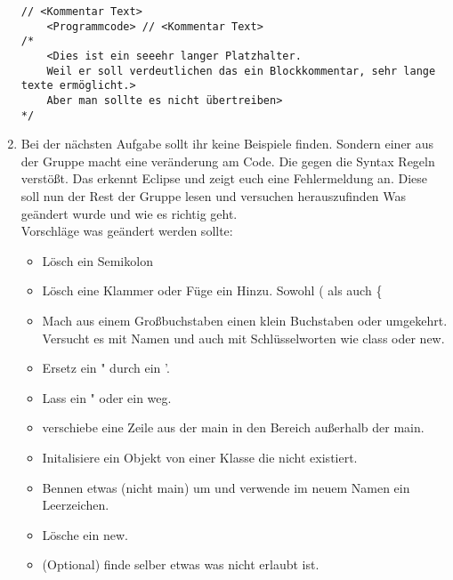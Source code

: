 \begin{enumerate}
          \begin{lstlisting}[title=\textbf{Kommentar Syntax},firstnumber=11]
// <Kommentar Text>
    <Programmcode> // <Kommentar Text>
/*
    <Dies ist ein seeehr langer Platzhalter. 
    Weil er soll verdeutlichen das ein Blockkommentar, sehr lange texte ermöglicht.>
    Aber man sollte es nicht übertreiben>
*/
        \end{lstlisting}
    \item Bei der nächsten Aufgabe sollt ihr keine Beispiele finden. Sondern einer aus der Gruppe macht eine veränderung am Code. Die gegen die Syntax Regeln verstößt. Das erkennt Eclipse und zeigt euch eine Fehlermeldung an. Diese soll nun der Rest der Gruppe lesen und versuchen herauszufinden Was geändert wurde und wie es richtig geht.\\
          Vorschläge was geändert werden sollte:
          \begin{itemize}
              \item Lösch ein Semikolon
              \item Lösch eine Klammer oder Füge ein Hinzu. Sowohl ( als auch \{
              \item Mach aus einem Großbuchstaben einen klein Buchstaben oder umgekehrt. Versucht es mit Namen und auch mit Schlüsselworten wie class oder new.
              \item Ersetz ein " durch ein '.
              \item Lass ein " oder ein weg.
              \item verschiebe eine Zeile aus der main in den Bereich außerhalb der main.
              \item Initalisiere ein Objekt von einer Klasse die nicht existiert.
              \item Bennen etwas (nicht main) um und verwende im neuem Namen ein Leerzeichen.
              \item Lösche ein new.
              \item (Optional) finde selber etwas was nicht erlaubt ist.
          \end{itemize}
\end{enumerate}
